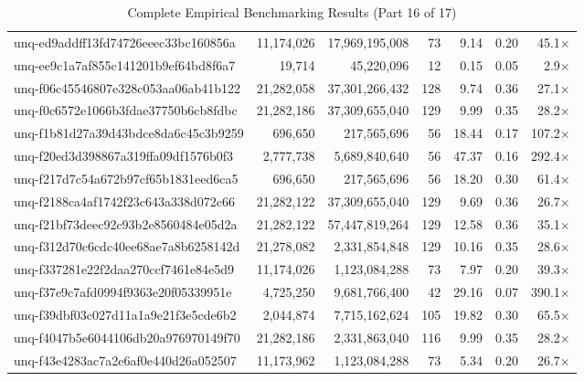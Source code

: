 \begin{table}[h!]
\begin{tabular}{lrrrrrr}
unq-ed9addff13fd74726eeec33bc160856a & 11,174,026 & 17,969,195,008 & 73 & 9.14 & 0.20 & 45.1$\times$ \\
unq-ee9c1a7af855c141201b9ef64bd8f6a7 & 19,714 & 45,220,096 & 12 & 0.15 & 0.05 & 2.9$\times$ \\
unq-f06c45546807e328c053aa06ab41b122 & 21,282,058 & 37,301,266,432 & 128 & 9.74 & 0.36 & 27.1$\times$ \\
unq-f0c6572e1066b3fdae37750b6cb8fdbc & 21,282,186 & 37,309,655,040 & 129 & 9.99 & 0.35 & 28.2$\times$ \\
unq-f1b81d27a39d43bdce8da6c45c3b9259 & 696,650 & 217,565,696 & 56 & 18.44 & 0.17 & 107.2$\times$ \\
unq-f20ed3d398867a319ffa09df1576b0f3 & 2,777,738 & 5,689,840,640 & 56 & 47.37 & 0.16 & 292.4$\times$ \\
unq-f217d7c54a672b97cf65b1831eed6ca5 & 696,650 & 217,565,696 & 56 & 18.20 & 0.30 & 61.4$\times$ \\
unq-f2188ca4af1742f23c643a338d072c66 & 21,282,122 & 37,309,655,040 & 129 & 9.69 & 0.36 & 26.7$\times$ \\
unq-f21bf73deec92c93b2e8560484e05d2a & 21,282,122 & 57,447,819,264 & 129 & 12.58 & 0.36 & 35.1$\times$ \\
unq-f312d70c6cdc40ee68ae7a8b6258142d & 21,278,082 & 2,331,854,848 & 129 & 10.16 & 0.35 & 28.6$\times$ \\
unq-f337281e22f2daa270ccf7461e84e5d9 & 11,174,026 & 1,123,084,288 & 73 & 7.97 & 0.20 & 39.3$\times$ \\
unq-f37e9c7afd0994f9363e20f05339951e & 4,725,250 & 9,681,766,400 & 42 & 29.16 & 0.07 & 390.1$\times$ \\
unq-f39dbf03c027d11a1a9e21f3e5cde6b2 & 2,044,874 & 7,715,162,624 & 105 & 19.82 & 0.30 & 65.5$\times$ \\
unq-f4047b5e6044106db20a976970149f70 & 21,282,186 & 2,331,863,040 & 116 & 9.99 & 0.35 & 28.2$\times$ \\
unq-f43e4283ac7a2e6af0e440d26a052507 & 11,173,962 & 1,123,084,288 & 73 & 5.34 & 0.20 & 26.7$\times$ \\
\bottomrule
\end{tabular}
\caption{Complete Empirical Benchmarking Results (Part 16 of 17)}
\end{table}

\clearpage

